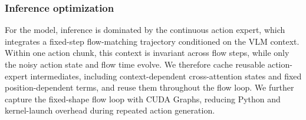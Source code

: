 \subsubsection{Inference optimization}
\label{sec:inference}
For the \molmoactt model, inference is dominated by the continuous action expert, which integrates a fixed-step flow-matching trajectory conditioned on the VLM context. Within one action chunk, this context is invariant across flow steps, while only the noisy action state and flow time evolve. We therefore cache reusable action-expert intermediates, including context-dependent cross-attention states and fixed position-dependent terms, and reuse them throughout the flow loop. We further capture the fixed-shape flow loop with CUDA Graphs, reducing Python and kernel-launch overhead during repeated action generation.

